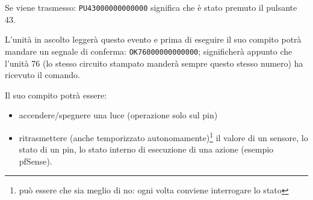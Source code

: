 \documentclass[italian]{article}
\begin{document}
    Se viene trasmesso: \texttt{PU43000000000000} significa che è stato premuto il pulsante 43.
    
    L'unità in ascolto leggerà questo evento e prima di eseguire il suo compito  potrà mandare un segnale di conferma: \texttt{OK76000000000000}; significherà appunto che l'unità 76 (lo stesso circuito stampato manderà sempre questo stesso numero) ha ricevuto il comando.
    
    Il suo compito potrà essere:
    
    \begin{itemize}
        \item accendere/spegnere una luce (operazione solo sul pin)
        \item ritrasmettere (anche temporizzato autonomamente)\footnote{può essere che sia meglio di no: ogni volta conviene interrogare lo stato} il valore di un sensore, lo stato di un pin, lo stato interno di esecuzione di una azione (esempio pfSense).
    \end{itemize}
    
\end{document}
